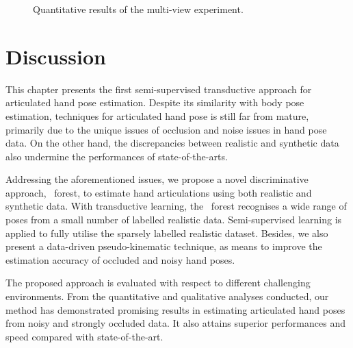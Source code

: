 \begin{figure}[ht]
{	}
	\caption{Quantitative results of the multi-view experiment.}
	\label{fig/hand/multiquant}
\end{figure}

 

\section{Discussion}

This chapter presents the first semi-supervised transductive approach for articulated hand pose estimation.  
Despite its similarity with body pose estimation, techniques for articulated hand pose is still far from mature, primarily due to the unique issues of occlusion and noise issues in hand pose data. 
On the other hand, the discrepancies between realistic and synthetic data also undermine the performances of state-of-the-arts. 

Addressing the aforementioned issues, we propose a novel discriminative approach, \STR\ forest, to estimate hand articulations using both realistic and synthetic data. With transductive learning, the \STR\ forest recognises a wide range of poses from a small number of labelled realistic data. Semi-supervised learning is applied to fully utilise the sparsely labelled realistic dataset. Besides, we also present a data-driven pseudo-kinematic technique, as means to improve the estimation accuracy of occluded and noisy hand poses. 

The proposed approach is evaluated with respect to different challenging environments.    
From the quantitative and qualitative analyses conducted, our method has demonstrated promising results in estimating articulated hand poses from noisy and strongly occluded data.  
It also attains superior performances and speed compared with state-of-the-art.  
